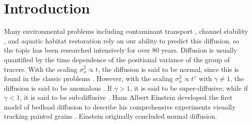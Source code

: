\documentclass[draft,grl]{agujournal2018}
\begin{document}
\section{Introduction}

Many environmental problems including contaminant transport \citep[e.g.,][]{Macklin2006}, channel stability \citep[e.g.,][]{Hassan2017}, and aquatic habitat restoration \citep[e.g.,][]{Gaeuman2017} rely on our ability to predict this diffusion, so the topic has been researched intensively for over 80 years.
Diffusion is usually quantified by the time dependence of the positional variance of the group of tracers.
With the scaling $\sigma_x^2 \propto t$, the diffusion is said to be normal, since this is found in the classic problems \citep[e.g.,][]{Einstein1905,Taylor1920}.
However, with the scaling $\sigma_x^2 \propto t^\gamma$ with $\gamma \neq 1$, the diffusion is said to be anomalous \citep{Sokolov2012}. 
If $\gamma>1$, it is said to be super-diffusive; while if $\gamma <1$, it is said to be sub-diffusive \citep{Metzler2000}.
Hans Albert Einstein developed the first model of bedload diffusion to describe his comprehensive  experiments visually tracking painted grains  \citep{Ettema2004,Einstein1937}.
Einstein originally concluded  normal diffusion.
\end{document}
